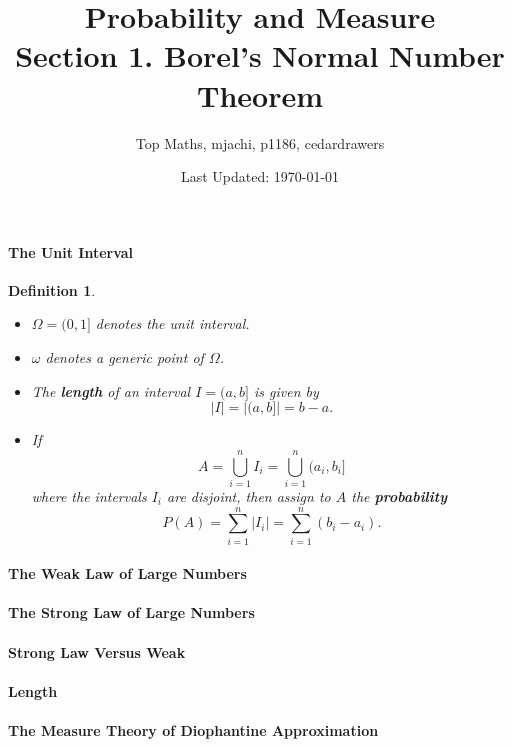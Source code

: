 \documentclass[12pt]{article}
\title{Probability and Measure \\ Section 1. Borel's Normal Number Theorem}
\date{Last Updated: \today}
\author{Top Maths, mjachi, p1186, cedardrawers}
\newtheorem{definition}{Definition}
\theoremstyle{definition}
\begin{document}
	\maketitle 
	\paragraph{The Unit Interval}
		\begin{definition} ~
			\begin{itemize}
				\item $\Omega = (0, 1]$ denotes the unit interval.
				
				\item $\omega$ denotes a generic point of $\Omega$. 
				
				\item The \textbf{\textit{length}} of an interval $I = (a, b]$ is given by $$|I| = |(a, b]| = b - a.$$ 
				
				\item If $$A = \bigcup_{i = 1}^n I_i = \bigcup_{i = 1}^n (a_i, b_i]$$ where the intervals $I_i$ are disjoint, then assign to $A$ the \textbf{\textit{probability}} $$P(A) = \sum_{i = 1}^n |I_i| = \sum_{i = 1}^n (b_i - a_i).$$
 			\end{itemize}
		\end{definition}
	\paragraph{The Weak Law of Large Numbers}
	
	\paragraph{The Strong Law of Large Numbers}
	
	\paragraph{Strong Law Versus Weak}
	
	\paragraph{Length}
	
	\paragraph{The Measure Theory of Diophantine Approximation}
\end{document}
